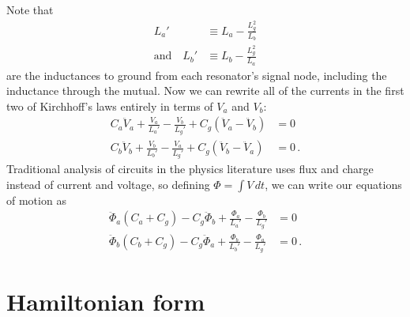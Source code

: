 \documentclass{article}
\begin{document}
Note that
\begin{align*}
  L_a' & \equiv L_a - \frac{L_g^2}{L_b} \\
  \text{and} \quad
  L_b' & \equiv L_b - \frac{L_g^2}{L_a}
\end{align*}
are the inductances to ground from each resonator's signal node, including the inductance through the mutual.
Now we can rewrite all of the currents in the first two of Kirchhoff's laws entirely in terms of $V_a$ and $V_b$:
\begin{align*}
  C_a \ddot V_a + \frac{V_a}{L_a'} - \frac{V_b}{L_g'} + C_g (\ddot V_a - \ddot V_b) &= 0 \\
  C_b \ddot V_b + \frac{V_b}{L_b'} - \frac{V_a}{L_g'} + C_g (\ddot V_b - \ddot V_a) &= 0 \, .
\end{align*}
Traditional analysis of circuits in the physics literature uses flux and charge instead of current and voltage, so defining $\Phi = \int V \, dt$, we can write our equations of motion as
\begin{align*}
  \ddot \Phi_a (C_a + C_g) - C_g \ddot \Phi_b + \frac{\Phi_a}{L_a'} - \frac{\Phi_b}{L_g'} &= 0 \\
  \ddot \Phi_b (C_b + C_g) - C_g \ddot \Phi_a + \frac{\Phi_b}{L_b'} - \frac{\Phi_a}{L_g'} &= 0 \, .
\end{align*}

\section{Hamiltonian form}
\end{document}
